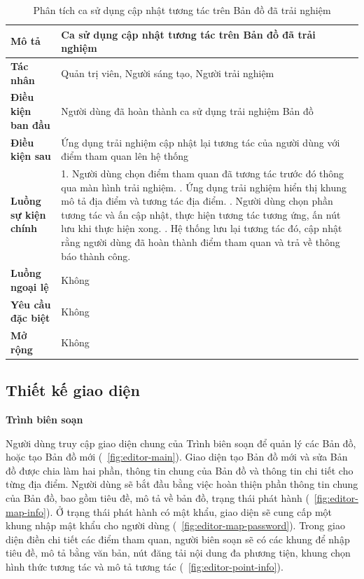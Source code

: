 \begin{table}
\centering
\caption{Phân tích ca sử dụng cập nhật tương tác trên Bản đồ đã trải nghiệm}
\begin{tabular}{|p{4cm}|p{10cm}|}
    \hline
\textbf{Mô tả} & Ca sử dụng cập nhật tương tác trên Bản đồ đã trải nghiệm \\ \hline
\textbf{Tác nhân} & Quản trị viên, Người sáng tạo, Người trải nghiệm \\ \hline
\textbf{Điều kiện ban đầu} & Người dùng đã hoàn thành ca sử dụng trải nghiệm Bản đồ \\ \hline
\textbf{Điều kiện sau} & Ứng dụng trải nghiệm cập nhật lại tương tác của người dùng với điểm tham quan lên hệ thống \\ \hline
\textbf{Luồng sự kiện chính} & 1. Người dùng chọn điểm tham quan đã tương tác trước đó thông qua màn hình trải nghiệm. \newline
2. Ứng dụng trải nghiệm hiển thị khung mô tả địa điểm và tương tác địa điểm. \newline
3. Người dùng chọn phần tương tác và ấn cập nhật, thực hiện tương tác tương ứng, ấn nút lưu khi thực hiện xong. \newline
4. Hệ thống lưu lại tương tác đó, cập nhật rằng người dùng đã hoàn thành điểm tham quan và trả về thông báo thành công. \\ \hline
\textbf{Luồng ngoại lệ} & Không \\ \hline
\textbf{Yêu cầu đặc biệt} & Không \\ \hline
\textbf{Mở rộng} & Không \\ \hline
\end{tabular}
\end{table}

\newpage
\subsection{Thiết kế giao diện}
\textbf{Trình biên soạn}

Người dùng truy cập giao diện chung của Trình biên soạn để quản lý các Bản đồ,
hoặc tạo Bản đồ mới (\figurename~\ref{fig:editor-main}). Giao diện tạo Bản đồ mới và sửa Bản đồ được chia làm hai
phần, thông tin chung của Bản đồ và thông tin chi tiết cho từng địa điểm. Người dùng
sẽ bắt đầu bằng việc hoàn thiện phần thông tin chung của Bản đồ, bao gồm tiêu đề, mô
tả về bản đồ, trạng thái phát hành (\figurename~\ref{fig:editor-map-info}). Ở trạng thái phát hành có mật khẩu, giao
diện sẽ cung cấp một khung nhập mật khẩu cho người dùng (\figurename~\ref{fig:editor-map-password}). Trong giao
diện điền chi tiết các điểm tham quan, người biên soạn sẽ có các khung để nhập tiêu
đề, mô tả bằng văn bản, nút đăng tải nội dung đa phương tiện, khung chọn hình thức
tương tác và mô tả tương tác (\figurename~\ref{fig:editor-point-info}).

